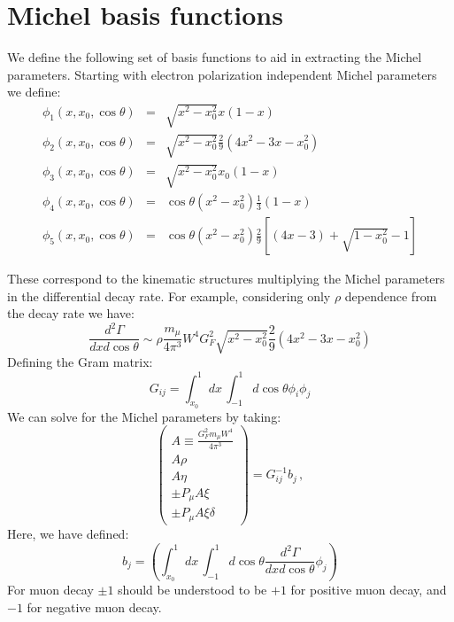 \section{Michel basis functions}\label{sec:michelbasis}

We define the following set of basis functions to aid in extracting the Michel parameters. Starting with electron polarization independent Michel parameters we define:
%
\begin{eqnarray}
\phi_1(x,x_0,\cos\theta)&=&\sqrt{x^2-x_0^2}x(1-x)\\
\phi_2(x,x_0,\cos\theta)&=&\sqrt{x^2-x_0^2}\frac{2}{9}(4x^2-3x-x_0^2)\\
\phi_3(x,x_0,\cos\theta)&=&\sqrt{x^2-x_0^2}x_0(1-x)\\
\phi_4(x,x_0,\cos\theta)&=&\cos\theta(x^2-x_0^2)\frac{1}{3}(1-x)\\
\phi_5(x,x_0,\cos\theta)&=&\cos\theta(x^2-x_0^2)\frac{2}{9}\left[(4x-3)+\sqrt{1-x_0^2}-1\right]
\end{eqnarray}

These correspond to the kinematic structures multiplying the Michel parameters in the differential decay rate. For example, considering only $\rho$ dependence from the decay rate we have:
%
\begin{equation}
\frac{d^2\Gamma}{dxd\cos\theta}\sim\rho \frac{m_\mu}{4\pi^3}W^4G_F^2\sqrt{x^2-x_0^2}\frac{2}{9}(4x^2-3x-x_0^2)
\end{equation}
%
Defining the Gram matrix:
%
\begin{equation}
G_{ij}=\int_{x_0}^1dx\, \int_{-1}^1d\cos\theta\phi_i\phi_j
\end{equation}
%
We can solve for the Michel parameters by taking:
%
\begin{equation}
\begin{pmatrix}
A\equiv \frac{G_F^2 m_\mu W^4}{4\pi^3}\\
A\rho\\
A\eta\\
\pm P_\mu A \xi\\
\pm P_\mu A \xi\delta
\end{pmatrix}=G_{ij}^{-1}b_j\, ,\label{eq:solveforMichel}
\end{equation}
%
Here, we have defined:
%
\begin{equation}
b_j=\left(\int_{x_0}^1dx\, \int_{-1}^{1}d\cos\theta \frac{d^2\Gamma}{dxd\cos\theta}\phi_j\right)
\end{equation}
%
For muon decay $\pm1$ should be understood to be $+1$ for positive muon decay, and $-1$ for negative muon decay.

